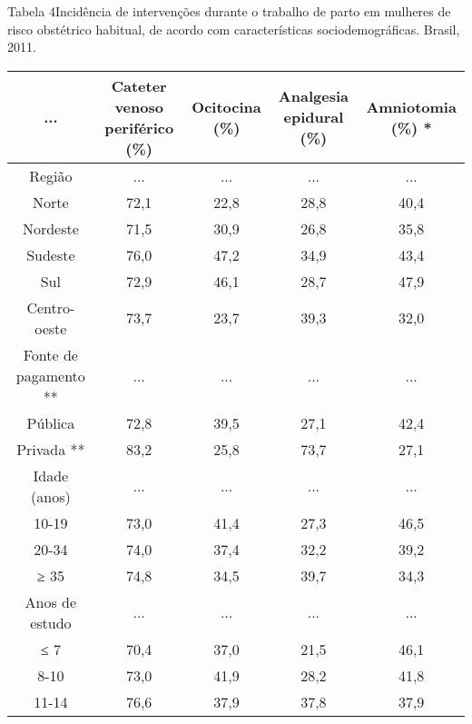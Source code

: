 \documentclass{article}
\begin{document}
Tabela 4Incidência de intervenções durante o trabalho de parto em mulheres de
risco obstétrico habitual, de acordo com características
sociodemográficas. Brasil, 2011.\begin{table}
\small\centering
\begin{tabulary}{\linewidth}{ C C C C C }
\hline... & Cateter venoso periférico (\%) & Ocitocina (\%) & Analgesia epidural (\%)
& Amniotomia (\%) *\\ \hline
Região
& ...
& ...
& ...
& ...
\\ \hline

Norte
& 72,1
& 22,8
& 28,8
& 40,4
\\ \hline

Nordeste
& 71,5
& 30,9
& 26,8
& 35,8
\\ \hline

Sudeste
& 76,0
& 47,2
& 34,9
& 43,4
\\ \hline

Sul
& 72,9
& 46,1
& 28,7
& 47,9
\\ \hline

Centro-oeste
& 73,7
& 23,7
& 39,3
& 32,0
\\ \hline

Fonte de pagamento **
& ...
& ...
& ...
& ...
\\ \hline

Pública
& 72,8
& 39,5
& 27,1
& 42,4
\\ \hline

Privada **
& 83,2
& 25,8
& 73,7
& 27,1
\\ \hline

Idade (anos)
& ...
& ...
& ...
& ...
\\ \hline

10-19
& 73,0
& 41,4
& 27,3
& 46,5
\\ \hline

20-34
& 74,0
& 37,4
& 32,2
& 39,2
\\ \hline

≥ 35
& 74,8
& 34,5
& 39,7
& 34,3
\\ \hline

Anos de estudo
& ...
& ...
& ...
& ...
\\ \hline

≤ 7
& 70,4
& 37,0
& 21,5
& 46,1
\\ \hline

8-10
& 73,0
& 41,9
& 28,2
& 41,8
\\ \hline

11-14
& 76,6
& 37,9
& 37,8
& 37,9
\\ \hline


\end{tabulary}
\end{table}
\end{document}
